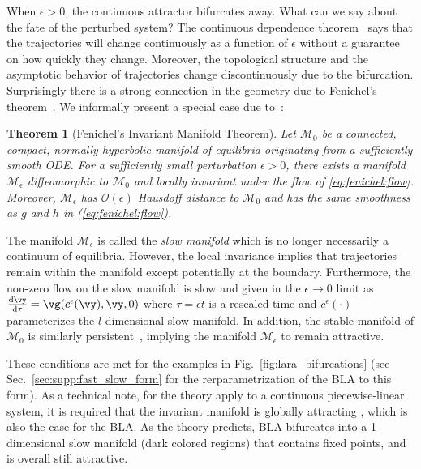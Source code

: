 \documentclass{article} %
\newcounter{ct}
\newcommand{\dm}[1]{\ensuremath{\mathrm{d}{#1}}} %
\newcommand{\RN}[2]{\frac{\dm{#1}}{\dm{#2}}} %
\newcommand{\manifold}{\mathcal{M}}
\newtheorem{theorem}{Theorem}
\theoremstyle{definition}
\theoremstyle{remark}
\renewcommand{\cite}{\citep}
\begin{document}
When $\epsilon > 0$, the continuous attractor bifurcates away.
What can we say about the fate of the perturbed system?
The continuous dependence theorem~\citep{Chicone2006} says that the trajectories will change continuously as a function of $\epsilon$ without a guarantee on how quickly they change.
Moreover, the topological structure and the asymptotic behavior of trajectories change discontinuously due to the bifurcation.
Surprisingly there is a strong connection in the geometry due to Fenichel's theorem~\cite{fenichel1971}.
We informally present a special case due to~\cite{Jones1995}:
\begin{theorem}[Fenichel's Invariant Manifold Theorem]
Let $\manifold_0$ be a connected, compact, normally hyperbolic manifold of equilibria originating from a sufficiently smooth ODE.
For a sufficiently small perturbation $\epsilon > 0$, there exists a manifold $\manifold_\epsilon$ diffeomorphic to $\manifold_0$ and locally invariant under the flow of \eqref{eq:fenichel:flow}.
Moreover, $\manifold_\epsilon$ has $\mathcal{O}(\epsilon)$ Hausdoff distance to $\manifold_0$ and has the same smoothness as $g$ and $h$ in (\ref{eq:fenichel:flow}).
\end{theorem}

The manifold $\manifold_\epsilon$ is called the \emph{slow manifold} which is no longer necessarily a continuum of equilibria.
However, the local invariance implies that trajectories remain within the manifold except potentially at the boundary.
Furthermore, the non-zero flow on the slow manifold is slow and given in the $\epsilon \to 0$ limit as $\RN{\vy}{\tau} = \vg(c^\epsilon(\vy), \vy, 0)$ where $\tau = \epsilon t$ is a rescaled time and $c^\epsilon(\cdot)$ parameterizes the $l$ dimensional slow manifold.
In addition, the stable manifold of $\manifold_0$ is similarly  persistent~\cite{Jones1995}, implying the manifold $\manifold_\epsilon$ to remain attractive.

These conditions are met for the examples in Fig.~\ref{fig:lara_bifurcations} (see Sec.~\ref{sec:supp:fast_slow_form} for the rerparametrization of the BLA to this form).
 As a technical note, for the theory apply to a continuous piecewise-linear system, it is required that the invariant manifold is globally attracting \cite{simpson2018}, which is also the case for the BLA.
As the theory predicts, BLA bifurcates into a 1-dimensional slow manifold (dark colored regions) that contains fixed points, and is overall still attractive.
\end{document}
